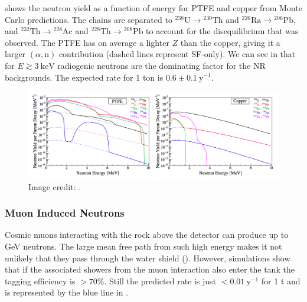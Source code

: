 { shows the neutron yield as a function of energy for PTFE and copper from Monte Carlo
predictions.  The chains are
separated to $\mathrm{^{238}U} \rightarrow \mathrm{^{230}Th}$ and $\mathrm{^{226}Ra} \rightarrow \mathrm{^{206}Pb}$, and
$\mathrm{^{232}Th} \rightarrow \mathrm{^{228}Ac}$ and $\mathrm{^{228}Th} \rightarrow \mathrm{^{208}Pb}$ to account for the disequilibrium
that was observed.  The PTFE has on average a lighter $Z$ than the copper, giving it a larger $(\alpha, \mathrm{n})$ contribution (dashed
lines represent SF-only).  We can see in  that for $E \gtrsim 3\ \mathrm{keV}$
radiogenic neutrons are the dominating factor for the NR backgrounds.  The expected rate for 1 ton is
$0.6 \pm 0.1\ \mathrm{y^{-1}}$.

\begin{figure}
\centering
\includegraphics[width=\textwidth]{NeutronYields}
\caption{Image credit: .}
\label{fig:backgrounds_nuclear_radiogenic_rates}
\end{figure}



\subsubsection{Muon Induced Neutrons}
\label{subsubsec:backgrounds_nuclear_muon_induced}
Cosmic muons interacting with the rock above the detector can produce up to GeV neutrons.  The large mean free path from such high energy
makes it not unlikely that they pass through the water shield ().  However, simulations show that if
the associated showers from the muon interaction also enter the tank the tagging efficiency is $> 70\%$.  Still the predicted rate is just
$< 0.01\ \mathrm{y^{-1}}$ for 1 t and is represented by the blue line in .

}
